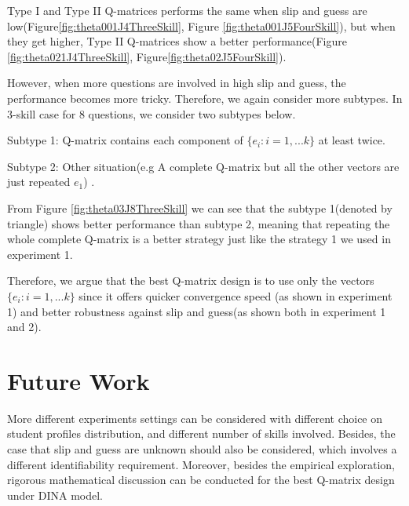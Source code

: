 \documentclass{edm_template}
\begin{document}
Type I and Type II Q-matrices performs the same when slip and guess are low(Figure\ref{fig:theta001J4ThreeSkill}, Figure \ref{fig:theta001J5FourSkill}), but when they get higher, Type II Q-matrices show a better performance(Figure \ref{fig:theta021J4ThreeSkill}, Figure\ref{fig:theta02J5FourSkill}).

However, when more questions are involved in high slip and guess, the performance becomes more tricky. Therefore, we again consider more subtypes. In 3-skill case for 8 questions, we consider two subtypes below. 

Subtype 1: Q-matrix contains each component of $\{e_{i}:i=1,...k\}$ at least twice. 

Subtype 2: Other situation(e.g A complete Q-matrix but all the other vectors are just repeated $e_1$)
.

From Figure \ref{fig:theta03J8ThreeSkill} we can see that the subtype 1(denoted by triangle) shows better performance than subtype 2, meaning that repeating the whole complete Q-matrix is a better strategy just like the strategy 1 we used in experiment 1.

Therefore, we argue that the best Q-matrix design is to use only the vectors $\{e_{i}:i=1,...k\}$ since it offers quicker convergence speed (as shown in experiment 1) and better robustness against slip and guess(as shown both in experiment 1 and 2).

\section{Future Work}
More different experiments settings can be considered with different choice on student profiles distribution, and different number of skills involved. Besides, the case that slip and guess are unknown should also be considered, which involves a different identifiability requirement\cite{xu2015identifiability}. Moreover, besides the empirical exploration, rigorous mathematical discussion can be conducted for the best Q-matrix design under DINA model. 


\end{document}
